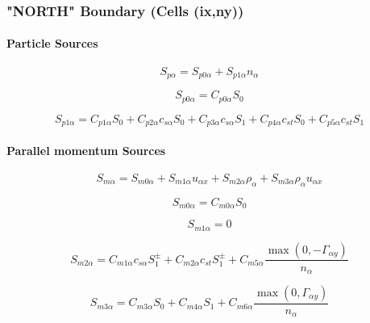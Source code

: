 \documentclass[a4paper,10pt]{report}
\begin{document}
\subsubsection{"NORTH" Boundary (Cells (ix,ny))}

\paragraph{Particle Sources}

\begin{equation}
S_{p\alpha}=S_{p0\alpha}+S_{p1\alpha}n_{\alpha}   \label{44}
\end{equation}

\begin{equation}
S_{p0\alpha}=C_{p0\alpha}S_{0}   \label{45}
\end{equation}

\begin{equation}
S_{p1\alpha}=C_{p1\alpha}S_{0}+C_{p2\alpha}c_{s\alpha}S_{0}+C_{p3\alpha}
c_{s\alpha}S_{1}+C_{p4\alpha}c_{st}S_{0}+C_{p5\alpha}c_{st}S_{1}
\label{46}
\end{equation}

\paragraph{Parallel momentum Sources}

\begin{equation}
S_{m\alpha}=S_{m0\alpha}+S_{m1\alpha}u_{\alpha x}+S_{m2\alpha}\rho_{\alpha}
+S_{m3\alpha}\rho_{\alpha}u_{\alpha x}   \label{47}
\end{equation}

\begin{equation}
S_{m0\alpha}=C_{m0\alpha}S_{0}   \label{48}
\end{equation}

\begin{equation}
S_{m1\alpha}=0   \label{49}
\end{equation}

\begin{equation}
S_{m2\alpha}=C_{m1\alpha}c_{s\alpha}S_{1}^{\pm}+C_{m2\alpha}c_{st}S_{1}^{\pm}
+C_{m5\alpha}\frac{\max\left( 0,-\Gamma_{\alpha y}\right) }{n_{\alpha}}  \label{50}
\end{equation}

\begin{equation}
S_{m3\alpha}=C_{m3\alpha}S_{0}+C_{m4\alpha}S_{1}+C_{m6\alpha}
\frac{\max\left( 0,\Gamma_{\alpha y}\right) }{n_{\alpha}}   \label{51}
\end{equation}
\end{document}
